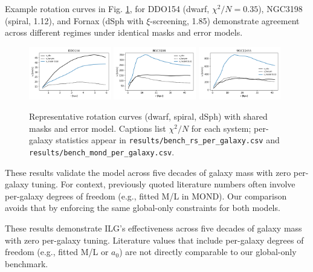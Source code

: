 \documentclass[12pt,a4paper]{article}
\begin{document}

Example rotation curves in Fig. \ref{fig:examples}, for DDO154 (dwarf, $\chi^2/N=0.35$), NGC3198 (spiral, 1.12), and Fornax (dSph with $\xi$-screening, 1.85) demonstrate agreement across different regimes under identical masks and error models.

\begin{figure}[h]
\centering
\includegraphics[width=0.32\textwidth]{results/examples_ddo154.png}
\includegraphics[width=0.32\textwidth]{results/examples_ngc3198.png}
\includegraphics[width=0.32\textwidth]{results/examples_fornax.png}
\caption{Representative rotation curves (dwarf, spiral, dSph) with shared masks and error model. Captions list $\chi^2/N$ for each system; per-galaxy statistics appear in \texttt{results/bench\_rs\_per\_galaxy.csv} and \texttt{results/bench\_mond\_per\_galaxy.csv}.}
\label{fig:examples}
\end{figure}

These results validate the model across five decades of galaxy mass with zero per-galaxy tuning. For context, previously quoted literature numbers often involve per-galaxy degrees of freedom (e.g., fitted M/L in MOND). Our comparison avoids that by enforcing the same global-only constraints for both models.


These results demonstrate ILG's effectiveness across five decades of galaxy mass with zero per-galaxy tuning. Literature values that include per-galaxy degrees of freedom (e.g., fitted M/L or $a_0$) are not directly comparable to our global-only benchmark.
\end{document}

